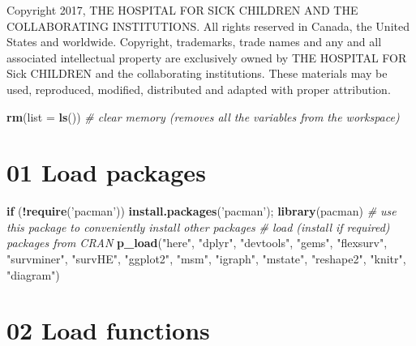 \documentclass[
]{article}
\newenvironment{Shaded}{\begin{snugshade}}{\end{snugshade}}
\newcommand{\CommentTok}[1]{\textcolor[rgb]{0.56,0.35,0.01}{\textit{#1}}}
\newcommand{\ControlFlowTok}[1]{\textcolor[rgb]{0.13,0.29,0.53}{\textbf{#1}}}
\newcommand{\DataTypeTok}[1]{\textcolor[rgb]{0.13,0.29,0.53}{#1}}
\newcommand{\KeywordTok}[1]{\textcolor[rgb]{0.13,0.29,0.53}{\textbf{#1}}}
\newcommand{\NormalTok}[1]{#1}
\newcommand{\OperatorTok}[1]{\textcolor[rgb]{0.81,0.36,0.00}{\textbf{#1}}}
\newcommand{\StringTok}[1]{\textcolor[rgb]{0.31,0.60,0.02}{#1}}
\begin{document}
Copyright 2017, THE HOSPITAL FOR SICK CHILDREN AND THE COLLABORATING
INSTITUTIONS. All rights reserved in Canada, the United States and
worldwide. Copyright, trademarks, trade names and any and all associated
intellectual property are exclusively owned by THE HOSPITAL FOR Sick
CHILDREN and the collaborating institutions. These materials may be
used, reproduced, modified, distributed and adapted with proper
attribution.

\newpage

\begin{Shaded}
\begin{Highlighting}[]
\KeywordTok{rm}\NormalTok{(}\DataTypeTok{list =} \KeywordTok{ls}\NormalTok{())      }\CommentTok{# clear memory (removes all the variables from the workspace)}
\end{Highlighting}
\end{Shaded}

\hypertarget{load-packages}{%
\section{01 Load packages}\label{load-packages}}

\begin{Shaded}
\begin{Highlighting}[]
\ControlFlowTok{if}\NormalTok{ (}\OperatorTok{!}\KeywordTok{require}\NormalTok{(}\StringTok{'pacman'}\NormalTok{)) }\KeywordTok{install.packages}\NormalTok{(}\StringTok{'pacman'}\NormalTok{); }\KeywordTok{library}\NormalTok{(pacman) }\CommentTok{# use this package to conveniently install other packages}
\CommentTok{# load (install if required) packages from CRAN}
\KeywordTok{p_load}\NormalTok{(}\StringTok{"here"}\NormalTok{, }\StringTok{"dplyr"}\NormalTok{, }\StringTok{"devtools"}\NormalTok{, }\StringTok{"gems"}\NormalTok{, }\StringTok{"flexsurv"}\NormalTok{, }\StringTok{"survminer"}\NormalTok{, }\StringTok{"survHE"}\NormalTok{, }\StringTok{"ggplot2"}\NormalTok{, }\StringTok{"msm"}\NormalTok{, }\StringTok{"igraph"}\NormalTok{, }\StringTok{"mstate"}\NormalTok{,   }\StringTok{"reshape2"}\NormalTok{, }\StringTok{"knitr"}\NormalTok{, }\StringTok{"diagram"}\NormalTok{)                                                  }
\end{Highlighting}
\end{Shaded}

\hypertarget{load-functions}{%
\section{02 Load functions}\label{load-functions}}
\end{document}
